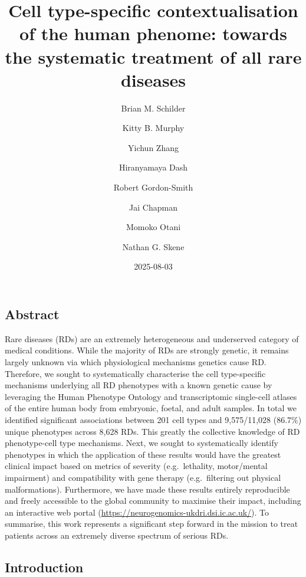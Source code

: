 \documentclass[
]{article}
\title{Cell type-specific contextualisation of the human phenome:
towards the systematic treatment of all rare diseases}
\author{Brian M. Schilder \and Kitty B. Murphy \and Yichun
Zhang \and Hiranyamaya Dash \and Robert Gordon-Smith \and Jai
Chapman \and Momoko Otani \and Nathan G. Skene}
\date{2025-08-03}
\begin{document}
\maketitle


\newpage{}

\subsection{Abstract}\label{abstract}

Rare diseases (RDs) are an extremely heterogeneous and underserved
category of medical conditions. While the majority of RDs are strongly
genetic, it remains largely unknown via which physiological mechanisms
genetics cause RD. Therefore, we sought to systematically characterise
the cell type-specific mechanisms underlying all RD phenotypes with a
known genetic cause by leveraging the Human Phenotype Ontology and
transcriptomic single-cell atlases of the entire human body from
embryonic, foetal, and adult samples. In total we identified significant
associations between 201 cell types and 9,575/11,028 (86.7\%) unique
phenotypes across 8,628 RDs. This greatly the collective knowledge of RD
phenotype-cell type mechanisms. Next, we sought to systematically
identify phenotypes in which the application of these results would have
the greatest clinical impact based on metrics of severity
(e.g.~lethality, motor/mental impairment) and compatibility with gene
therapy (e.g.~filtering out physical malformations). Furthermore, we
have made these results entirely reproducible and freely accessible to
the global community to maximise their impact, including an interactive
web portal (\url{https://neurogenomics-ukdri.dsi.ic.ac.uk/}). To
summarise, this work represents a significant step forward in the
mission to treat patients across an extremely diverse spectrum of
serious RDs.

\subsection{Introduction}\label{sec-introduction}
\end{document}
